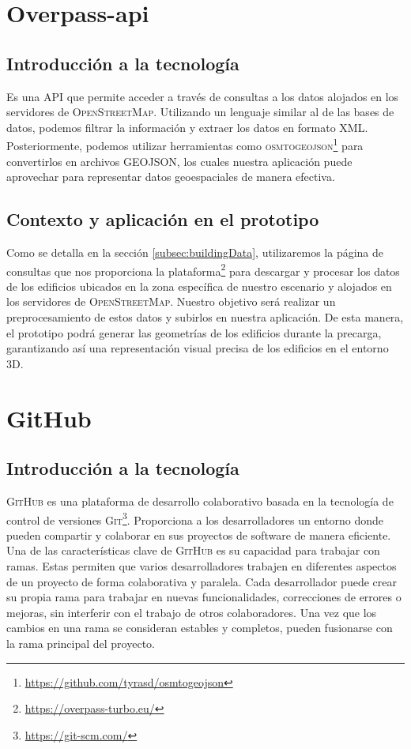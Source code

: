 \documentclass[a4paper, 11pt]{book}
\begin{document}
\section{Overpass-api}
\subsection{Introducción a la tecnología}
Es una \textsc{\gls{API}} que permite acceder a través de consultas a los datos alojados en los servidores de \textsc{OpenStreetMap}. Utilizando un lenguaje similar al de las bases de datos, podemos filtrar la información y extraer los datos en formato \textsc{XML}. Posteriormente, podemos utilizar herramientas como \textsc{osmtogeojson}\footnote{\url{https://github.com/tyrasd/osmtogeojson}} para convertirlos en archivos \textsc{GEOJSON}, los cuales nuestra aplicación puede aprovechar para representar datos geoespaciales de manera efectiva.
\subsection{Contexto y aplicación en el prototipo}
Como se detalla en la sección \ref{subsec:buildingData}, utilizaremos la página de consultas que nos proporciona la plataforma\footnote{\url{https://overpass-turbo.eu/}} para descargar y procesar los datos de los edificios ubicados en la zona específica de nuestro escenario y alojados en los servidores de \textsc{OpenStreetMap}. Nuestro objetivo será realizar un preprocesamiento de estos datos y subirlos en nuestra aplicación. De esta manera, el prototipo podrá generar las geometrías de los edificios durante la precarga, garantizando así una representación visual precisa de los edificios en el entorno \textsc{\gls{3D}}.
\section{GitHub}
\label{sec:github}
\subsection{Introducción a la tecnología}
\textsc{GitHub} es una plataforma de desarrollo colaborativo basada en la tecnología de control de versiones \textsc{Git}\footnote{\url{https://git-scm.com/}}. Proporciona a los desarrolladores un entorno donde pueden compartir y colaborar en sus proyectos de software de manera eficiente.
Una de las características clave de \textsc{GitHub} es su capacidad para trabajar con ramas. Estas permiten que varios desarrolladores trabajen en diferentes aspectos de un proyecto de forma colaborativa y paralela. Cada desarrollador puede crear su propia rama para trabajar en nuevas funcionalidades, correcciones de errores o mejoras, sin interferir con el trabajo de otros colaboradores. Una vez que los cambios en una rama se consideran estables y completos, pueden fusionarse con la rama principal del proyecto.
\end{document}
